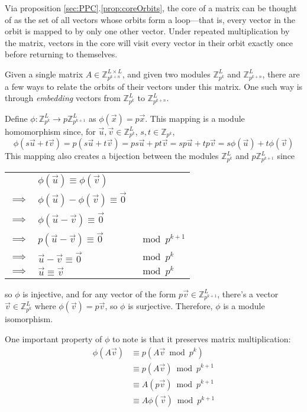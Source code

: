 \documentclass[a4paper, 12pt, reqno]{amsart}
\begin{document}
		Via proposition \ref{sec:PPC}.\ref{prop:coreOrbits}, the core of a matrix can be thought of as the set of all vectors whose orbits form a loop---that is, every vector
		in the orbit is mapped to by only one other vector. Under repeated multiplication by the matrix, vectors in the core will visit every vector in their orbit exactly 
		once before returning to themselves.
		
		Given a single matrix $A \in \mathds{Z}_{p^{k+n}}^{L \times L}$, and given two modules $\mathds{Z}_{p^k}^{L}$ and $\mathds{Z}_{p^{k+n}}^L$, there are a few ways to 
		relate the orbits of their vectors under this matrix. One such way is through \emph{embedding} vectors from $\mathds{Z}_{p^k}^L$ to $\mathds{Z}_{p^{k+n}}^L$.
		
		Define $\phi : \mathds{Z}_{p^{k}}^{L} \rightarrow p\mathds{Z}_{p^{k+1}}^{L}$ as $\phi(\vec{x}) = p\vec{x}$. This mapping is a module homomorphism since,
		for $\vec{u}, \vec{v} \in \mathds{Z}_{p^k}^L$, $s, t \in \mathds{Z}_{p^k}$,
		\[
			\phi(s\vec{u} + t\vec{v}) = p(s\vec{u} + t\vec{v}) = ps\vec{u} + pt\vec{v} = sp\vec{u} + tp\vec{v} = s\phi(\vec{u}) + t\phi(\vec{v})
		\]
		This mapping also creates a bijection between the modules $\mathds{Z}_{p^k}^L$ and $p\mathds{Z}_{p^{k+1}}^L$ since
		\begin{center}
			\begin{tabular}{*{3}{l}}
						   & $\phi(\vec{u}) \equiv \phi(\vec{v})$           &                 \\
				$\implies$ & $\phi(\vec{u}) - \phi(\vec{v}) \equiv \vec{0}$ &                 \\
				$\implies$ & $\phi(\vec{u} - \vec{v}) \equiv \vec{0}$       &                 \\
				$\implies$ & $p(\vec{u} - \vec{v}) \equiv \vec{0}$          & $\mod{p^{k+1}}$ \\
				$\implies$ & $\vec{u} - \vec{v} \equiv \vec{0}$             & $\mod{p^k}$     \\
				$\implies$ & $\vec{u} \equiv \vec{v}$                       & $\mod{p^k}$     \\
			\end{tabular}
		\end{center}
		so $\phi$ is injective, and for any vector of the form $p\vec{v} \in \mathds{Z}_{p^{k+1}}^L$, there's a vector $\vec{v} \in \mathds{Z}_{p^k}^L$ where 
		$\phi(\vec{v}) = p\vec{v}$, so $\phi$ is surjective. Therefore, $\phi$ is a module isomorphism.
		
		One important property of $\phi$ to note is that it preserves matrix multiplication:
		\begin{align*}
			\phi(A\vec{v}) & \equiv p(A\vec{v} \bmod{p^k})     \\
			               & \equiv p(A\vec{v}) \bmod{p^{k+1}} \\
						   & \equiv A(p\vec{v}) \bmod{p^{k+1}} \\
						   & \equiv A\phi(\vec{v}) \bmod{p^{k+1}}
		\end{align*}
		
\end{document}
